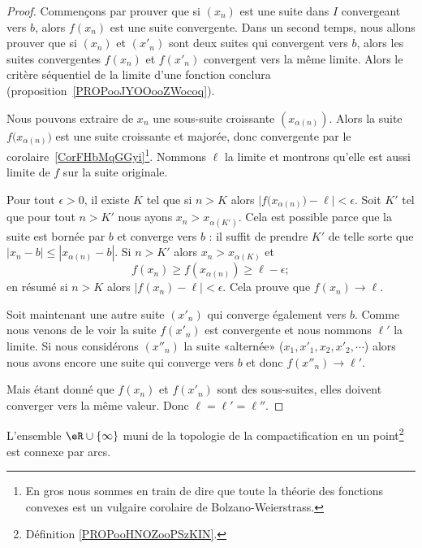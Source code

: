 \begin{proof}
	Commençons par prouver que si \( (x_n)\) est une suite dans \( I\) convergeant vers \( b\), alors \( f(x_n)\) est une suite convergente. Dans un second temps, nous allons prouver que si \( (x_n)\) et \( (x'_n)\) sont deux suites qui convergent vers \( b\), alors les suites convergentes \( f(x_n)\) et \( f(x'_n)\) convergent vers la même limite. Alors le critère séquentiel de la limite d'une fonction conclura (proposition~\ref{PROPooJYOOooZWocoq}).

	Nous pouvons extraire de \( x_n\) une sous-suite croissante \( (x_{\alpha(n)})\). Alors la suite \( f\big( x_{\alpha(n)} \big)\) est une suite croissante et majorée, donc convergente par le corolaire~\ref{CorFHbMqGGyi}\footnote{En gros nous sommes en train de dire que toute la théorie des fonctions convexes est un vulgaire corolaire de Bolzano-Weierstrass.}. Nommons \( \ell\) la limite et montrons qu'elle est aussi limite de \( f\) sur la suite originale.

	Pour tout \( \epsilon>0\), il existe \( K\) tel que si \( n>K\) alors \( \big| f\big( x_{\alpha(n)} \big)-\ell \big|<\epsilon\). Soit \( K'\) tel que pour tout \( n>K'\) nous ayons \( x_n>x_{\alpha(K')}\). Cela est possible parce que la suite est bornée par \( b\) et converge vers \( b\) : il suffit de prendre \( K'\) de telle sorte que \( | x_n-b |\leq | x_{\alpha(n)}-b |\). Si \( n>K'\) alors \( x_n>x_{\alpha(K)}\) et
	\begin{equation}
		f(x_n)\geq f(x_{\alpha(n)})\geq \ell-\epsilon;
	\end{equation}
	en résumé si \( n>K\) alors \( | f(x_n)-\ell |<\epsilon\). Cela prouve que \( f(x_n)\to\ell\).

	Soit maintenant une autre suite \( (x'_n)\) qui converge également vers \( b\). Comme nous venons de le voir la suite \( f(x'_n)\) est convergente et nous nommons \( \ell'\) la limite. Si nous considérons \( (x''_n)\) la suite «alternée» (\( x_1,x'_1,x_2,x'_2,\cdots\)) alors nous avons encore une suite qui converge vers \( b\) et donc \( f(x''_n)\to \ell'\).

	Mais étant donné que \( f(x_n)\) et \( f(x'_n)\) sont des sous-suites, elles doivent converger vers la même valeur. Donc \( \ell=\ell'=\ell''\).
\end{proof}


\begin{proposition}      \label{PROPooLOQVooULDhZz}
	L'ensemble \( \eR\cup\{ \infty \}\) muni de la topologie de la compactification en un point\footnote{Définition \ref{PROPooHNOZooPSzKIN}.} est connexe par arcs.
\end{proposition}

